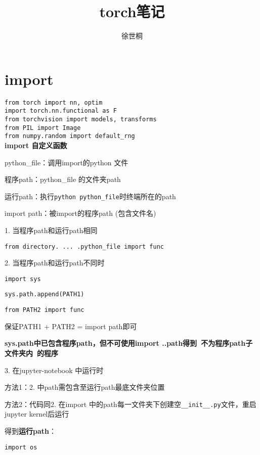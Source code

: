 \documentclass[UTF8]{ctexart}
\title{torch笔记}
\author{徐世桐}
\date{}
\begin{document}
\maketitle

\section{import}
\noindent \texttt{from torch import nn, optim}\\
\texttt{import torch.nn.functional as F}\\
\texttt{from torchvision import models, transforms}\\
\texttt{from PIL import Image}\\
\texttt{from numpy.random import default\_rng}\\
\textbf{import 自定义函数}

  python\_file：调用import的python 文件

  程序path：python\_file 的文件夹path

  运行path：执行\texttt{python python\_file}时终端所在的path

  import path：被import的程序path (包含文件名)

  1. 当程序path和运行path相同

  \quad \texttt{from directory. ... .python\_file import func}

  2. 当程序path和运行path不同时

  \quad \texttt{import sys}

  \quad \texttt{sys.path.append(PATH1)}

  \quad \texttt{from PATH2 import func}

  \quad \quad 保证PATH1 + PATH2 = import path即可

  \quad \textbf{sys.path中已包含程序path，但不可使用import ..path得到\ 不为程序path子文件夹内\ 的程序}

  3. 在jupyter-notebook 中运行时

  \quad 方法1：2. 中path需包含至运行path最底文件夹位置

  \quad 方法2：代码同2. 在import 中的path每一文件夹下创建空\texttt{\_\_init\_\_.py}文件，重启jupyter kernel后运行

  得到\textbf{运行path}：

  \quad \texttt{import os}
\end{document}
